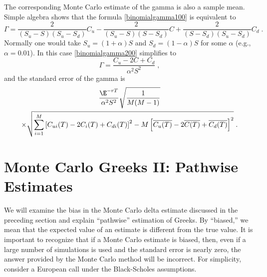 The corresponding Monte Carlo estimate of the gamma is also a sample mean.  Simple algebra shows that the formula \eqref{binomialgamma100} is equivalent to
\begin{equation}\label{binomialgamma200}
\Gamma = \frac{2}{(S_u-S)(S_u-S_d)}C_u - \frac{2}{(S_u-S)(S-S_d)}C +\frac{2}{(S-S_d)(S_u-S_d)}C_d\;.
\end{equation}
Normally one would take $S_u=(1+\alpha)S$ and $S_d = (1-\alpha)S$ for some $\alpha$ (e.g., $\alpha=0.01$).  In this case  \eqref{binomialgamma200}
simplifies to
\begin{equation}\label{binomialgamma300}
\Gamma = \frac{C_u - 2C + C_d}{\alpha^2S^2}\;,
\end{equation}
and the standard error of the gamma is
\begin{multline*}\frac{\E^{-rT}}{\alpha^2S^2}\sqrt{\frac{1}{M(M-1)}}\\
\times \sqrt{\sum_{i=1}^M \left[C_{ui}(T)-2C_i(T)+C_{di}(T)\right]^2 -M\left[\overline{C_{u}(T)}-2\overline{C(T)}+\overline{C_{d}(T)}\right]^2}\; .
\end{multline*}


\section{Monte Carlo Greeks II: Pathwise Estimates}\label{s_montecarlogreeks2}
We will examine the bias in the Monte Carlo delta estimate discussed in the preceding section and explain  ``pathwise'' estimation of Greeks. By ``biased,'' we mean that the expected value of an estimate is different from the true value.  It is important to recognize that if a Monte Carlo estimate is biased, then, even if a large number of simulations is used and the standard error is nearly zero, the answer provided by the Monte Carlo method will be incorrect.   For simplicity, consider a European call under the Black-Scholes assumptions.  

